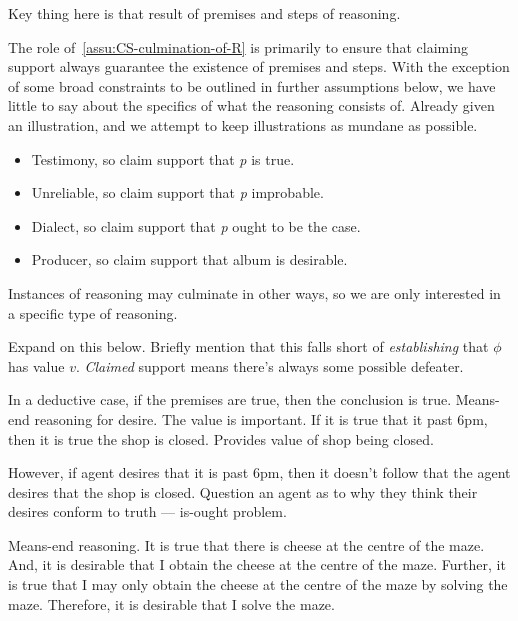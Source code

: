 \begin{note}
  Key thing here is that result of premises and steps of reasoning.

  The role of~\autoref{assu:CS-culmination-of-R} is primarily to ensure that claiming support always guarantee the existence of premises and steps.
  With the exception of some broad constraints to be outlined in further assumptions below,  we have little to say about the specifics of what the reasoning consists of.
  Already given an illustration, and we attempt to keep illustrations as mundane as possible.
\end{note}

\begin{note}
  \begin{itemize}
  \item Testimony, so claim support that \emph{p} is true.
  \item Unreliable, so claim support that \emph{p} improbable.
  \item Dialect, so claim support that \emph{p} ought to be the case.
  \item Producer, so claim support that album is desirable.
  \end{itemize}
\end{note}

\begin{note}
  Instances of reasoning may culminate in other ways, so we are only interested in a specific type of reasoning.

  
\end{note}

\begin{note}
  Expand on this below.
  Briefly mention that this falls short of \emph{establishing} that \(\phi\) has value \(v\).
  \emph{Claimed} support means there's always some possible defeater.
\end{note}

\begin{note}
  In a deductive case, if the premises are true, then the conclusion is true.
  Means-end reasoning for desire.
  The value is important.
  If it is true that it past 6pm, then it is true the shop is closed.
  Provides value of shop being closed.

  However, if agent desires that it is past 6pm, then it doesn't follow that the agent desires that the shop is closed.
  Question an agent as to why they think their desires conform to truth --- is-ought problem.

  Means-end reasoning.
  It is true that there is cheese at the centre of the maze.
  And, it is desirable that I obtain the cheese at the centre of the maze.
  Further, it is true that I may only obtain the cheese at the centre of the maze by solving the maze.
  Therefore, it is desirable that I solve the maze.
\end{note}

